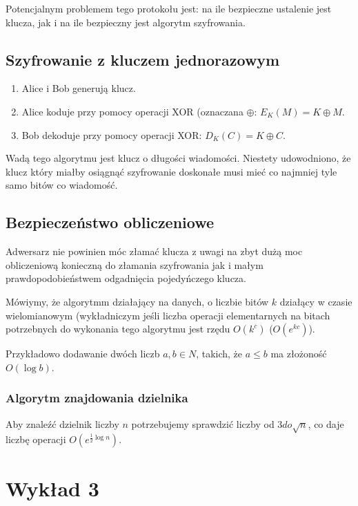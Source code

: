 \documentclass{report}
\begin{document}
Potencjalnym problemem tego protokołu jest: na ile bezpieczne ustalenie jest klucza, jak i na ile bezpieczny jest algorytm szyfrowania.

\section{Szyfrowanie z kluczem jednorazowym}

\begin{enumerate}
\item Alice i Bob generują klucz.
\item Alice koduje przy pomocy operacji XOR (oznaczana $\oplus$: $ E_K(M) = K \oplus M $.
\item Bob dekoduje przy pomocy operacji XOR: $D_K(C) = K \oplus C$.
\end{enumerate}

Wadą tego algorytmu jest klucz o długości wiadomości. Niestety udowodniono, że klucz który miałby osiągnąć szyfrowanie doskonałe musi mieć co najmniej tyle samo bitów co wiadomość.

\section{Bezpieczeństwo obliczeniowe}

Adwersarz nie powinien móc złamać klucza z uwagi na zbyt dużą moc obliczeniową konieczną do złamania szyfrowania jak i małym prawdopodobieństwem odgadnięcia pojedyńczego klucza.

Mówiymy, że algorytmm działający na danych, o liczbie bitów $k$ działący w czasie wielomianowym (wykładniczym jeśli liczba operacji elementarnych na bitach potrzebnych do wykonania tego algorytmu jest rzędu $O(k^c)$ ($O(e^{kc})$).

Przykładowo dodawanie dwóch liczb $a, b \in N$, takich, że $a\leq b$ ma złożoność $O(\log b)$.

\subsection{Algorytm znajdowania dzielnika}

Aby znaleźć dzielnik liczby $n$ potrzebujemy sprawdzić liczby od $3 do \sqrt n$, co daje liczbę operacji $O(e^{\frac{1}{2}\log n})$.

\chapter{Wykład 3}
\end{document}
